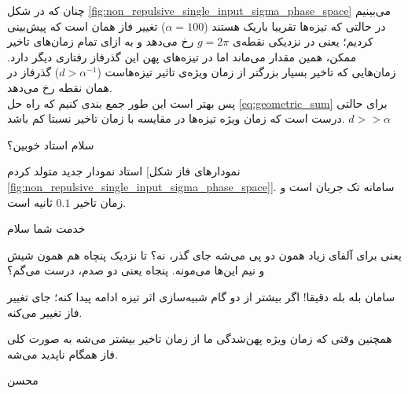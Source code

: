 چنان که در شکل \ref{fig:non_repulsive_single_input_sigma_phase_space} می‌بینیم در حالتی که تیزه‌ها تقریبا باریک هستند ($\alpha = 100$) تغییر فاز همان است که پیش‌بینی کردیم؛ یعنی در نزدیکی نقطه‌ی 
$g = 2\pi$
رخ می‌دهد و به ازای تمام زمان‌های تاخیر ممکن، همین مقدار می‌ماند اما در تیزه‌های پهن این گذرفاز رفتاری دیگر دارد. زمان‌هایی که تاخیر بسیار بزرگتر از زمان ویژه‌ی تاثیر تیزه‌هاست
($d > \alpha^{-1}$)
گذرفاز در همان نقطه رخ می‌دهد.\\

پس بهتر است این طور جمع بندی‌ کنیم که راه حل
\ref{eq:geometric_sum}
برای حالتی درست است که زمان ویژه تیزه‌ها در مقایسه با زمان تاخیر نسبتا کم باشد.
$d >> \alpha$

\begin{mohsenletter}
	سلام استاد خوبین؟
	
	استاد نمودار جدید متولد کردم [نمودارهای فاز شکل \ref{fig:non_repulsive_single_input_sigma_phase_space}].
	سامانه تک جریان است و زمان تاخیر
	 $0.1$
	  ثانیه است.
	
	خدمت شما
	سلام
	
	یعنی برای آلفای زیاد همون دو پی می‌شه جای گذر، نه؟ تا نزدیک پنچاه هم همون شیش و نیم ‌این‌ها می‌مونه. پنجاه یعنی دو صدم، درست می‌گم؟
	
	سامان
	بله بله دقیقا!
	اگر بیشتر از دو گام شبیه‌سازی اثر تیزه ادامه پیدا کنه؛ جای تغییر فاز تغییر می‌کنه.
	
	همچنین وقتی که زمان ویژه پهن‌شدگی ما از زمان تاخیر بیشتر می‌شه به صورت کلی فاز همگام ناپدید می‌شه.
	
	
	محسن
\end{mohsenletter}


